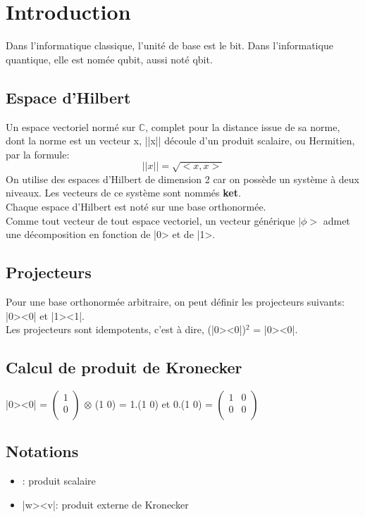 \section{Introduction}
Dans l'informatique classique, l'unité de base est le bit. Dans l'informatique quantique, elle est nomée qubit, aussi
noté qbit.

\subsection{Espace d'Hilbert}
Un espace vectoriel normé sur $\mathbb{C}$, complet pour la distance issue de sa norme, dont la norme est un
vecteur x, ||x|| découle d'un produit scalaire, ou Hermitien, par la formule:$$||x||=\sqrt{<x,x>}$$
On utilise des espaces d'Hilbert de dimension 2 car on possède un système à deux niveaux. Les vecteurs de ce système
sont nommés \textbf{ket}.\\
Chaque espace d'Hilbert est noté sur une base orthonormée.\\
Comme tout vecteur de tout espace vectoriel, un vecteur générique $|\phi>$ admet une décomposition en fonction de |0> et
de |1>.

\subsection{Projecteurs}
Pour une base orthonormée arbitraire, on peut définir les projecteurs suivants: |0><0| et |1><1|.\\
Les projecteurs sont idempotents, c'est à dire, (|0><0|)$^2$ = |0><0|.

\subsection{Calcul de produit de Kronecker}
|0><0| = $\begin{pmatrix} 1\\ 0\\ \end{pmatrix}$ $\otimes$ (1 0) = 1.(1 0) et 0.(1 0) = $\begin{pmatrix} 1 & 0\\ 0 & 0\\
\end{pmatrix}$

\subsection{Notations}
\begin{itemize}
	\item <v|w>: produit scalaire
	\item |w><v|: produit externe de Kronecker
\end{itemize}
